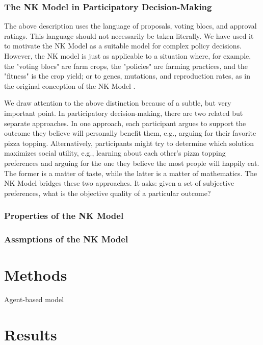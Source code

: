 \documentclass[manuscript,screen,review,acmsmall]{acmart}
\begin{document}
\subsubsection{The NK Model in Participatory Decision-Making}
The above description uses the language of proposals, voting blocs, and approval ratings. This language should not necessarily be taken literally.
We have used it to motivate the NK Model as a suitable model for complex policy decisions.
However, the NK model is just as applicable to a situation where, for example, the "voting blocs" are farm crops, the "policies" are farming practices, and the "fitness" is the crop yield; or to genes, mutations, and reproduction rates, as in the original conception of the NK Model \cite{kauffman_towards_1987}.

We draw attention to the above distinction because of a subtle, but very important point.
In participatory decision-making, there are two related but separate approaches.
In one approach, each participant argues to support the outcome they believe will personally benefit them, e.g., arguing for their favorite pizza topping.
Alternatively, participants might try to determine which solution maximizes social utility, e.g., learning about each other's pizza topping preferences and arguing for the one they believe the most people will happily eat.
The former is a matter of taste, while the latter is a matter of mathematics.
The NK Model bridges these two approaches.
It asks: given a set of subjective preferences,
what is the objective quality of a particular outcome?

\subsubsection{Properties of the NK Model}

\subsubsection{Assmptions of the NK Model}

\section{Methods\label{sec:methods}}
Agent-based model



\section{Results}
\end{document}
